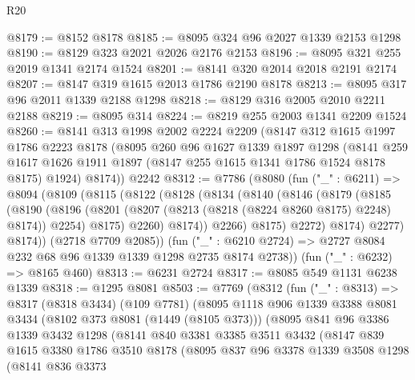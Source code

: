 \begin{lexlean}{R20}
\begin{coremodule}
@8179 := @8152 @8178
@8185 := @8095 @324 @96 @2027 @1339 @2153 @1298
@8190 := @8129 @323 @2021 @2026 @2176 @2153
@8196 := @8095 @321 @255 @2019 @1341 @2174 @1524
@8201 := @8141 @320 @2014 @2018 @2191 @2174
@8207 := @8147 @319 @1615 @2013 @1786 @2190 @8178
@8213 := @8095 @317 @96 @2011 @1339 @2188 @1298
@8218 := @8129 @316 @2005 @2010 @2211 @2188
@8219 := @8095 @314
@8224 := @8219 @255 @2003 @1341 @2209 @1524
@8260 := @8141
    @313
    @1998
    @2002
    @2224
    @2209
    (@8147
      @312
      @1615
      @1997
      @1786
      @2223
      @8178
      (@8095
        @260
        @96
        @1627
        @1339
        @1897
        @1298
        (@8141 @259 @1617 @1626 @1911 @1897 (@8147 @255 @1615 @1341 @1786 @1524 @8178 @8175) @1924)
        @8174))
    @2242
@8312 := @7786
    (@8080
      (fun ("_" : @6211) =>
      @8094
        (@8109
          (@8115
            (@8122
              (@8128
                (@8134
                  (@8140
                    (@8146
                      (@8179
                        (@8185
                          (@8190
                            (@8196
                              (@8201 (@8207 (@8213 (@8218 (@8224 @8260 @8175) @2248) @8174)) @2254)
                              @8175)
                            @2260)
                          @8174))
                      @2266)
                    @8175)
                  @2272)
                @8174)
              @2277)
            @8174))
        (@2718 @7709 @2085))
      (fun ("_" : @6210 @2724) => @2727 @8084 @232 @68 @96 @1339 @1339 @1298 @2735 @8174 @2738))
    (fun ("_" : @6232) => @8165 @460)
@8313 := @6231 @2724
@8317 := @8085 @549 @1131 @6238 @1339
@8318 := @1295 @8081
@8503 := @7769
    (@8312
      (fun ("_" : @8313) =>
      @8317
        (@8318 @3434)
        (@109 @7781)
        (@8095
          @1118
          @906
          @1339
          @3388
          @8081
          @3434
          (@8102 @373 @8081 (@1449 (@8105 @373)))
          (@8095
            @841
            @96
            @3386
            @1339
            @3432
            @1298
            (@8141
              @840
              @3381
              @3385
              @3511
              @3432
              (@8147
                @839
                @1615
                @3380
                @1786
                @3510
                @8178
                (@8095
                  @837
                  @96
                  @3378
                  @1339
                  @3508
                  @1298
                  (@8141
                    @836
                    @3373

\end{coremodule}
\end{lexlean}
